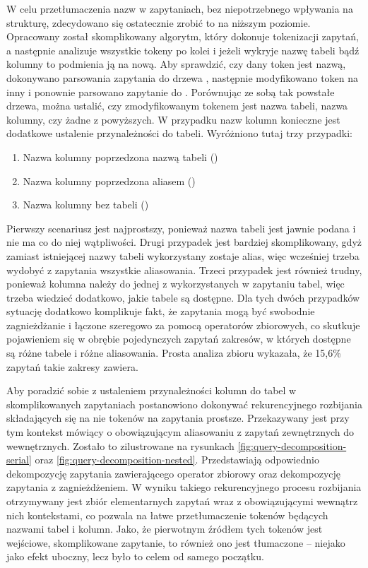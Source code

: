 W celu przetłumaczenia nazw w zapytaniach, bez niepotrzebnego wpływania na strukturę, zdecydowano się ostatecznie zrobić to na niższym poziomie. Opracowany został skomplikowany algorytm, który dokonuje tokenizacji zapytań, a następnie analizuje wszystkie tokeny po kolei i jeżeli wykryje nazwę tabeli bądź kolumny to podmienia ją na nową. Aby sprawdzić, czy dany token jest nazwą, dokonywano parsowania zapytania do drzewa , następnie modyfikowano token na inny i ponownie parsowano zapytanie do . Porównując ze sobą tak powstałe drzewa, można ustalić, czy zmodyfikowanym tokenem jest nazwa tabeli, nazwa kolumny, czy żadne z powyższych. W przypadku nazw kolumn konieczne jest dodatkowe ustalenie przynależności do tabeli. Wyróżniono tutaj trzy przypadki:

\begin{enumerate}
    \item Nazwa kolumny poprzedzona nazwą tabeli ()
    \item Nazwa kolumny poprzedzona aliasem ()
    \item Nazwa kolumny bez tabeli ()
\end{enumerate}

Pierwszy scenariusz jest najprostszy, ponieważ nazwa tabeli jest jawnie podana i nie ma co do niej wątpliwości. Drugi przypadek jest bardziej skomplikowany, gdyż zamiast istniejącej nazwy tabeli wykorzystany zostaje alias, więc wcześniej trzeba wydobyć z zapytania wszystkie aliasowania. Trzeci przypadek jest również trudny, ponieważ kolumna należy do jednej z wykorzystanych w zapytaniu tabel, więc trzeba wiedzieć dodatkowo, jakie tabele są dostępne. Dla tych dwóch przypadków sytuację dodatkowo komplikuje fakt, że zapytania mogą być swobodnie zagnieżdżanie i łączone szeregowo za pomocą operatorów zbiorowych, co skutkuje pojawieniem się w obrębie pojedynczych zapytań zakresów, w których dostępne są różne tabele i różne aliasowania. Prosta analiza zbioru  wykazała, że 15,6\% zapytań takie zakresy zawiera. 

Aby poradzić sobie z ustaleniem przynależności kolumn do tabel w skomplikowanych zapytaniach postanowiono dokonywać rekurencyjnego rozbijania składających się na nie tokenów na zapytania prostsze. Przekazywany jest przy tym kontekst mówiący o obowiązującym aliasowaniu z zapytań zewnętrznych do wewnętrznych. Zostało to zilustrowane na rysunkach 
\ref{fig:query-decomposition-serial} oraz \ref{fig:query-decomposition-nested}. Przedstawiają odpowiednio dekompozycję zapytania zawierającego operator zbiorowy oraz dekompozycję zapytania z zagnieżdżeniem. W wyniku takiego rekurencyjnego procesu rozbijania otrzymywany jest zbiór elementarnych zapytań wraz z obowiązującymi wewnątrz nich kontekstami, co pozwala na łatwe przetłumaczenie tokenów będących nazwami tabel i kolumn. Jako, że pierwotnym źródłem tych tokenów jest wejściowe, skomplikowane zapytanie, to również ono jest tłumaczone -- niejako jako efekt uboczny, lecz było to celem od samego początku.

